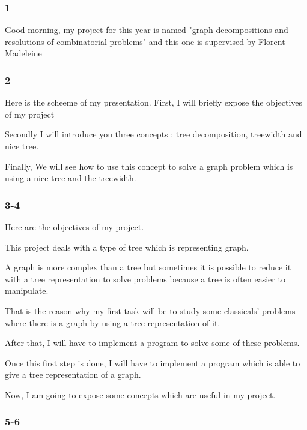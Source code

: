\documentclass[a4paper, 10pt,french,landscape]{article}
\begin{document}
\begin{multicols}{3}

\subsubsection*{ 1 }

Good morning,
my project for this year is named "graph decompositions and resolutions of combinatorial problems" 
and this one is supervised by Florent Madeleine

\subsubsection*{ 2}

Here is the scheeme of my presentation. 
First, I will briefly expose the objectives of my project

Secondly I will introduce you three concepts : tree decomposition, treewidth and nice tree.

Finally, We will see how to use this concept to solve a graph problem which is using a nice tree and the treewidth.


\subsubsection*{ 3-4}



Here are the objectives of my project.

This project deals with a type of tree which is representing graph.

 A graph is more complex than a tree but sometimes it is possible to reduce it with a tree representation to solve problems because a tree is often easier to manipulate.

That is the reason why my first task will be to study some classicals' problems where there is a graph by using a tree representation of it.

After that, I will have to implement a program to solve some of these problems.

Once this first step is done, I will have to implement a program which is able to give a tree representation of a graph.

Now, I am going to expose some concepts which are useful in my project.



\subsubsection*{ 5-6}





\end{multicols}
\end{document}
